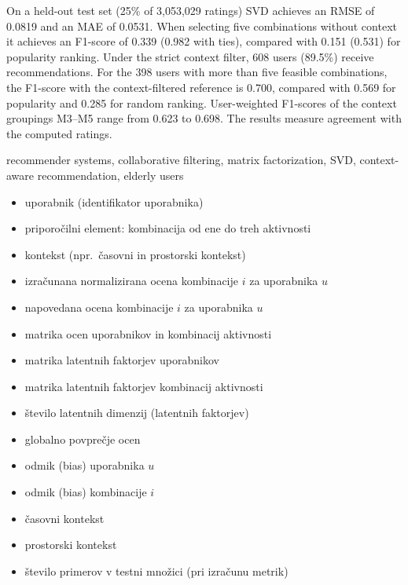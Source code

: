 \documentclass[a4paper,twoside,openright,12pt,slovene]{book}
\begin{document}
On a held-out test set (25\% of 3,053,029 ratings) SVD achieves an RMSE of
0.0819 and an MAE of 0.0531. When selecting five combinations without
context it achieves an F1-score of 0.339 (0.982 with ties), compared with
0.151 (0.531) for popularity ranking. Under the strict context filter, 608
users (89.5\%) receive recommendations. For the 398 users with more than
five feasible combinations, the F1-score with the context-filtered reference
is 0.700, compared with 0.569 for popularity and 0.285 for random ranking.
User-weighted F1-scores of the context groupings M3--M5 range from 0.623 to
0.698. The results measure agreement with the computed ratings.


\keywords
recommender systems, collaborative filtering, matrix factorization, SVD, context-aware recommendation, elderly users



\tableofcontents

\seznamslik
\seznamtabel

\seznamsimbolov
\begin{itemize}[leftmargin=*,itemsep=2pt]
  \item[$u$] uporabnik (identifikator uporabnika)
  \item[$i$] priporočilni element: kombinacija od ene do treh aktivnosti
  \item[$c$] kontekst (npr.\ časovni in prostorski kontekst)
  \item[$r_{u,i}$] izračunana normalizirana ocena kombinacije $i$ za uporabnika $u$
  \item[$\hat{r}_{u,i}$] napovedana ocena kombinacije $i$ za uporabnika $u$
  \item[$R$] matrika ocen uporabnikov in kombinacij aktivnosti
  \item[$P$] matrika latentnih faktorjev uporabnikov
  \item[$Q$] matrika latentnih faktorjev kombinacij aktivnosti
  \item[$k$] število latentnih dimenzij (latentnih faktorjev)
  \item[$\mu$] globalno povprečje ocen
  \item[$b_u$] odmik (bias) uporabnika $u$
  \item[$b_i$] odmik (bias) kombinacije $i$
  \item[$C_T$] časovni kontekst
  \item[$C_P$] prostorski kontekst
  \item[$n$] število primerov v testni množici (pri izračunu metrik)
\end{itemize}
\end{document}
